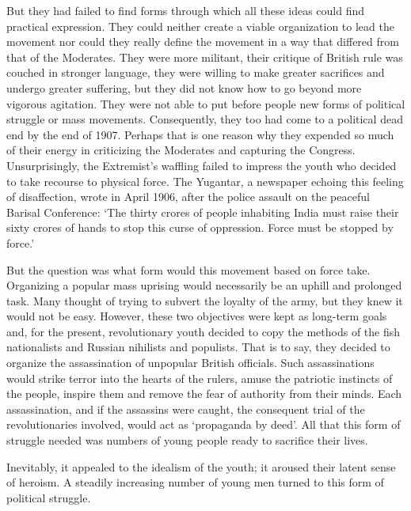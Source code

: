 \begin{multicols}{2}
But they had failed to find forms through which all these ideas could find practical expression. They could neither create a viable organization to lead the movement nor could they really define the movement in a way that differed from that of the Moderates. They were more militant, their critique of British rule was couched in stronger language, they were willing to make greater sacrifices and undergo greater suffering, but they did not know how to go beyond more vigorous agitation. They were not able to put before people new forms of political struggle or mass movements. Consequently, they too had come to a political dead end by the end of 1907. Perhaps that is one reason why they expended so much of their energy in criticizing the Moderates and capturing the Congress. Unsurprisingly, the Extremist's waffling failed to impress the youth who decided to take recourse to physical force. The Yugantar, a newspaper echoing this feeling of disaffection, wrote in April 1906, after the police assault on the peaceful Barisal Conference: `The thirty crores of people inhabiting India must raise their sixty crores of hands to stop this curse of oppression. Force must be stopped by force.'

But the question was what form would this movement based on force take. Organizing a popular mass uprising would necessarily be an uphill and prolonged task. Many thought of trying to subvert the loyalty of the army, but they knew it would not be easy. However, these two objectives were kept as long-term goals and, for the present, revolutionary youth decided to copy the methods of the fish nationalists and Russian nihilists and populists. That is to say, they decided to organize the assassination of unpopular British officials. Such assassinations would strike terror into the hearts of the rulers, amuse the patriotic instincts of the people, inspire them and remove the fear of authority from their minds. Each assassination, and if the assassins were caught, the consequent trial of the revolutionaries involved, would act as `propaganda by deed'. All that this form of struggle needed was numbers of young people ready to sacrifice their lives.

Inevitably, it appealed to the idealism of the youth; it aroused their latent sense of heroism. A steadily increasing number of young men turned to this form of political struggle.


\end{multicols}
